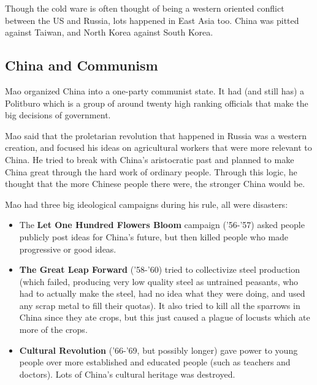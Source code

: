 

Though the cold ware is often thought of being a western oriented
conflict between the US and Russia, lots happened in East Asia
too. China was pitted against Taiwan, and North Korea against South
Korea.

\subsection{China and Communism}

Mao organized China into a one-party communist state. It had (and
still has) a Politburo which is a group of around twenty high ranking
officials that make the big decisions of government.


Mao said that the proletarian revolution that happened in Russia was a
western creation, and focused his ideas on agricultural workers that
were more relevant to China. He tried to break with China's
aristocratic past and planned to make China great through the hard
work of ordinary people. Through this logic, he thought that the more
Chinese people there were, the stronger China would be.

Mao had three big ideological campaigns during his rule, all were
disasters:


\begin{itemize}
  \item The \textbf{Let One Hundred Flowers Bloom} campaign ('56-'57)
    asked people publicly post ideas for China's future, but then
    killed people who made progressive or good ideas.
  \item \textbf{The Great Leap Forward} ('58-'60) tried to
    collectivize steel production (which failed, producing very low
    quality steel as untrained peasants, who had to actually make the
    steel, had no idea what they were doing, and used any scrap metal
    to fill their quotas). It also tried to kill all the sparrows in
    China since they ate crops, but this just caused a plague of
    locusts which ate more of the crops.
  \item \textbf{Cultural Revolution} ('66-'69, but possibly longer)
    gave power to young people over more established and educated
    people (such as teachers and doctors). Lots of China's cultural
    heritage was destroyed.
\end{itemize}

